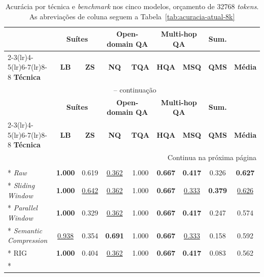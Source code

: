 {
\footnotesize
\setlength{\tabcolsep}{3pt}
\begin{longtable}{lcc|cc|cc|c|c}
\caption{Acurácia por técnica e \textit{benchmark} nos cinco modelos, orçamento de 32768 \textit{tokens}. As abreviações de coluna seguem a Tabela~\ref{tab:acuracia-atual-8k}}
\label{tab:acuracia-atual-32k} \\
\toprule
& \multicolumn{2}{c|}{\textbf{Suítes}} & \multicolumn{2}{c|}{\textbf{Open-domain QA}} & \multicolumn{2}{c|}{\textbf{Multi-hop QA}} & \multicolumn{1}{c|}{\textbf{Sum.}} & \\
\cmidrule(lr){2-3}\cmidrule(lr){4-5}\cmidrule(lr){6-7}\cmidrule(lr){8-8}
\textbf{Técnica} & \textbf{LB} & \textbf{ZS} & \textbf{NQ} & \textbf{TQA} & \textbf{HQA} & \textbf{MSQ} & \textbf{QMS} & \textbf{Média} \\
\midrule
\endfirsthead
\multicolumn{9}{c}{\tablename\ \thetable{} -- continuação} \\
\toprule
& \multicolumn{2}{c|}{\textbf{Suítes}} & \multicolumn{2}{c|}{\textbf{Open-domain QA}} & \multicolumn{2}{c|}{\textbf{Multi-hop QA}} & \multicolumn{1}{c|}{\textbf{Sum.}} & \\
\cmidrule(lr){2-3}\cmidrule(lr){4-5}\cmidrule(lr){6-7}\cmidrule(lr){8-8}
\textbf{Técnica} & \textbf{LB} & \textbf{ZS} & \textbf{NQ} & \textbf{TQA} & \textbf{HQA} & \textbf{MSQ} & \textbf{QMS} & \textbf{Média} \\
\midrule
\endhead
\midrule
\multicolumn{9}{r}{Continua na próxima página} \\
\endfoot
\bottomrule
\endlastfoot
\multicolumn{9}{l}{\textit{Llama 3.1 8B}} \\*
\textit{Raw}                   & \textbf{1.000} & 0.619 & \underline{0.362} & 1.000 & \textbf{0.667} & \textbf{0.417} & 0.326 & \textbf{0.627} \\*
\textit{Sliding Window}        & \textbf{1.000} & \underline{0.642} & \underline{0.362} & 1.000 & \textbf{0.667} & \underline{0.333} & \textbf{0.379} & \underline{0.626} \\*
\textit{Parallel Window}       & \textbf{1.000} & 0.329 & \underline{0.362} & 1.000 & \textbf{0.667} & \textbf{0.417} & 0.247 & 0.574 \\*
\textit{Semantic Compression}  & \underline{0.938} & 0.354 & \textbf{0.691} & 1.000 & \textbf{0.667} & \underline{0.333} & 0.158 & 0.592 \\*
RIG                            & \textbf{1.000} & 0.404 & \underline{0.362} & 1.000 & \textbf{0.667} & \textbf{0.417} & 0.083 & 0.562 \\*

\end{longtable}}
